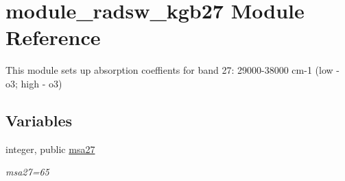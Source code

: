 \hypertarget{namespacemodule__radsw__kgb27}{}\section{module\+\_\+radsw\+\_\+kgb27 Module Reference}
\label{namespacemodule__radsw__kgb27}


This module sets up absorption coeffients for band 27\+: 29000-\/38000 cm-\/1 (low -\/ o3; high -\/ o3)  


\subsection*{Variables}
\begin{DoxyCompactItemize}
\item 
\mbox{\label{namespacemodule__radsw__kgb27_abdab838f66aba14b64bce733f797cf26}} 
integer, public \hyperlink{namespacemodule__radsw__kgb27_abdab838f66aba14b64bce733f797cf26}{msa27}
\begin{DoxyCompactList}\small\item\em msa27=65 \end{DoxyCompactList}\end{DoxyCompactItemize}
